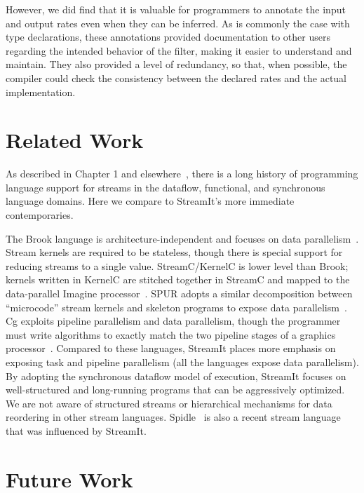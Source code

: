   However, we did find that it is valuable for programmers to annotate
  the input and output rates even when they can be inferred.  As is
  commonly the case with type declarations, these annotations provided
  documentation to other users regarding the intended behavior of the
  filter, making it easier to understand and maintain.  They also
  provided a level of redundancy, so that, when possible, the compiler
  could check the consistency between the declared rates and the
  actual implementation.

\myend

\section{Related Work}
\label{sec:lang-related}

As described in Chapter 1 and elsewhere~\cite{stephens_survey_1997}, there is a
long history of programming language support for streams in the
dataflow, functional, and synchronous language domains.  Here we
compare to StreamIt's more immediate contemporaries.

The Brook language is architecture-independent and focuses on data
parallelism~\cite{brook04}.  Stream kernels are required to be
stateless, though there is special support for reducing streams to a
single value.  Stream\-C/Ker\-nel\-C is lower level than Brook;
kernels written in KernelC are stitched together in StreamC and mapped
to the data-parallel Imagine processor~\cite{imagine03ieee}.  SPUR
adopts a similar decomposition between ``microcode'' stream kernels
and skeleton programs to expose data parallelism~\cite{spur05samos}.
Cg exploits pipeline parallelism and data parallelism, though the
programmer must write algorithms to exactly match the two pipeline
stages of a graphics processor~\cite{cg03}.  Compared to these
languages, StreamIt places more emphasis on exposing task and pipeline
parallelism (all the languages expose data parallelism).
By adopting the synchronous dataflow model of execution, StreamIt
focuses on well-structured and long-running programs that can be
aggressively optimized.  We are not aware of structured streams or
hierarchical mechanisms for data reordering in other stream languages.
Spidle~\cite{spidle03} is also a recent stream language that was
influenced by StreamIt.

\section{Future Work}

